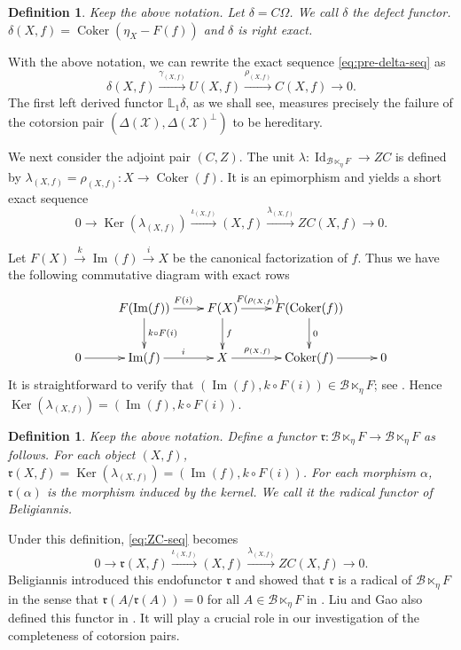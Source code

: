 \documentclass[11pt,reqno]{amsart}
\numberwithin{equation}{section}
\newtheorem{definition}[theorem]{Definition}
\newcommand{\cB}{\mathcal B}
\newcommand{\cX}{\mathcal X}
\newcommand{\Coker}{\operatorname{Coker}}
\newcommand{\Ker}{\operatorname{Ker}}
\newcommand{\Ima}{\operatorname{Im}}
\newcommand{\Id}{\operatorname{Id}}
\newcommand{\radf}{\mathfrak r}
\begin{document}
\begin{definition}
Keep the above notation. Let $\delta=C\Omega$. We call $\delta$ the defect functor. $\delta(X,f)=\Coker(\eta_X-F(f))$ and $\delta$ is right exact.
\end{definition}

With the above notation, we can rewrite the exact sequence \eqref{eq:pre-delta-seq} as
\begin{equation}\label{eq:delta-seq}
\delta(X,f)\xrightarrow{\gamma_{(X,f)}} U(X,f)\xrightarrow{\rho_{(X,f)}} C(X,f)\rightarrow 0.
\end{equation}
The first left derived functor $\mathbb{L}_1\delta$, as we shall see, measures precisely the failure of the cotorsion pair
$(\Delta(\cX),\Delta(\cX)^\perp)$ to be hereditary.



We next consider the adjoint pair $(C,Z)$. The unit $\lambda\colon \Id_{\cB\ltimes_{\eta}F}\to ZC$ is defined by
$\lambda_{(X,f)}=\rho_{(X,f)}\colon X\rightarrow \Coker(f)$. It is an epimorphism and yields a short exact sequence
\begin{equation}\label{eq:ZC-seq}
0 \rightarrow \Ker(\lambda_{(X,f)}) \xrightarrow{\iota_{(X,f)}} (X,f) \xrightarrow{\lambda_{(X,f)}} ZC(X,f)\rightarrow 0.
\end{equation}

Let $F(X)\xrightarrow{k}\Ima(f)\xrightarrow{i} X$ be the canonical factorization of $f$. Thus we have the following commutative diagram with exact rows
\[
\xymatrix{
& F(\Ima(f))\ar[r]^{F(i)}\ar[d]^{k\circ F(i)} & F(X) \ar[r]^{F(\rho_{(X,f)})\ \ \ \ }\ar[d]^{f} & F(\Coker(f)) \ar[d]^{0} \\
0 \ar[r] & \Ima(f) \ar[r]^i & X \ar[r]^{\rho_{(X,f)}\ \ \ \ } & \Coker(f) \ar[r] & 0
}
\]
It is straightforward to verify that $(\Ima(f),k\circ F(i))\in \cB\ltimes_{\eta}F$; see \cite[Lemma 3.14]{Hu}. Hence $\Ker(\lambda_{(X,f)})=(\Ima(f),k\circ F(i))$.

\begin{definition}
Keep the above notation. Define a functor $\radf\colon \cB\ltimes_{\eta}F\to \cB\ltimes_{\eta}F$ as follows. For each object $(X,f)$, $\radf(X,f)=\Ker(\lambda_{(X,f)})=(\Ima(f),k\circ F(i))$. For each morphism $\alpha$,
$\radf(\alpha)$ is the morphism induced by the kernel. We call it the {radical functor} of Beligiannis.
\end{definition}

Under this definition, \eqref{eq:ZC-seq} becomes
\begin{equation}\label{eq:radical-seq}
0 \rightarrow \radf(X,f) \xrightarrow{\iota_{(X,f)}} (X,f) \xrightarrow{\lambda_{(X,f)}} ZC(X,f)\rightarrow 0.
\end{equation}
Beligiannis introduced this endofunctor $\radf$ and showed that $\radf$ is a radical of $\cB\ltimes_\eta F$ in the sense that
$\radf(A/\radf(A))=0$ for all $A\in \cB\ltimes_\eta F$ in \cite[Subsection~5.1]{Beligiannis}. Liu and Gao also defined this functor in \cite[Proposition~3.3]{LG}.
It will play a crucial role in our investigation of the completeness of cotorsion pairs.
\end{document}
